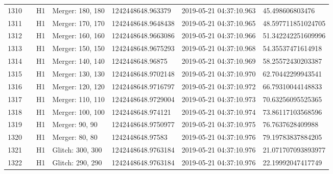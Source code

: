 \begin{longtable}{lllllll}
1310 &                                                    &       H1 &  Merger: 180, 180 &   1242448648.963379 &  2019-05-21 04:37:10.963 &     45.498606803476 \\
1311 &                                                    &       H1 &  Merger: 170, 170 &  1242448648.9648438 &  2019-05-21 04:37:10.965 &  48.597711851024705 \\
1312 &                                                    &       H1 &  Merger: 160, 160 &  1242448648.9663086 &  2019-05-21 04:37:10.966 &  51.342242251609996 \\
1313 &                                                    &       H1 &  Merger: 150, 150 &  1242448648.9675293 &  2019-05-21 04:37:10.968 &   54.35537471614918 \\
1314 &                                                    &       H1 &  Merger: 140, 140 &    1242448648.96875 &  2019-05-21 04:37:10.969 &   58.25572430203387 \\
1315 &                                                    &       H1 &  Merger: 130, 130 &  1242448648.9702148 &  2019-05-21 04:37:10.970 &   62.70442299943541 \\
1316 &                                                    &       H1 &  Merger: 120, 120 &  1242448648.9716797 &  2019-05-21 04:37:10.972 &   66.79310044148833 \\
1317 &                                                    &       H1 &  Merger: 110, 110 &  1242448648.9729004 &  2019-05-21 04:37:10.973 &   70.63256095525365 \\
1318 &                                                    &       H1 &  Merger: 100, 100 &   1242448648.974121 &  2019-05-21 04:37:10.974 &   73.86117103568596 \\
1319 &                                                    &       H1 &    Merger: 90, 90 &  1242448648.9750977 &  2019-05-21 04:37:10.975 &    76.7637628409988 \\
1320 &                                                    &       H1 &    Merger: 80, 80 &    1242448648.97583 &  2019-05-21 04:37:10.976 &   79.19783837884205 \\
1321 &                                                    &       H1 &  Glitch: 300, 300 &  1242448648.9763184 &  2019-05-21 04:37:10.976 &  21.071707093893977 \\
1322 &                                                    &       H1 &  Glitch: 290, 290 &  1242448648.9763184 &  2019-05-21 04:37:10.976 &   22.19992047417749 \\

\end{longtable}
